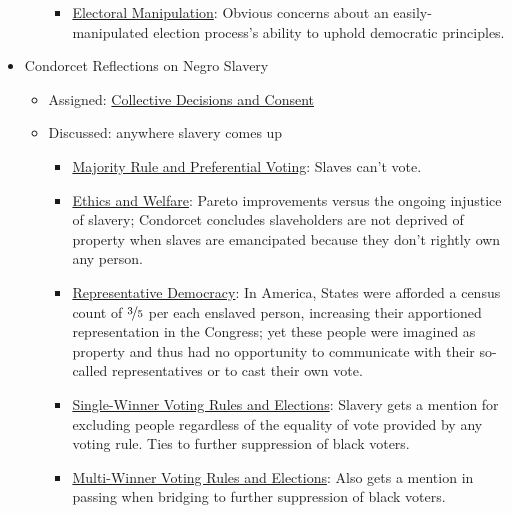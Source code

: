 \begin{itemize}
\begin{itemize}
\begin{itemize}
            \item \hyperref[cur:manipulation]{Electoral Manipulation}:  Obvious concerns about an easily-manipulated election process's ability to uphold democratic principles.
        \end{itemize}
    \end{itemize}

    \item Condorcet Reflections on Negro Slavery \autocite{Condorcet1781}
    \begin{itemize}
        \item Assigned:  \hyperref[cur:collective-decisions-consent]{Collective Decisions and Consent}
        \item Discussed:  anywhere slavery comes up
        \begin{itemize}
            \item \hyperref[cur:majority]{Majority Rule and Preferential Voting}:  Slaves can't vote.

            \item \hyperref[cur:ethics]{Ethics and Welfare}:  Pareto improvements versus the ongoing injustice of slavery; Condorcet concludes slaveholders are not deprived of property when slaves are emancipated because they don't rightly own any person.

            \item \hyperref[cur:representative-democracy]{Representative Democracy}:  In America, States were afforded a census count of $\nicefrac{3}{5}$ per each enslaved person, increasing their apportioned representation in the Congress; yet these people were imagined as property and thus had no opportunity to communicate with their so-called representatives or to cast their own vote.

            \item \hyperref[cur:single-winner-voting-rules]{Single-Winner Voting Rules and Elections}:  Slavery gets a mention for excluding people regardless of the equality of vote provided by any voting rule.  Ties to further suppression of black voters.

            \item \hyperref[cur:multi-winner-voting-rules]{Multi-Winner Voting Rules and Elections}:  Also gets a mention in passing when bridging to further suppression of black voters.

        \end{itemize}
    \end{itemize}


\end{itemize}

